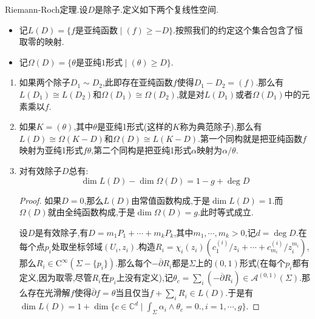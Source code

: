 Riemann-Roch定理.设$D$是除子.定义如下两个复线性空间.
\begin{itemize}
	\item 记$L(D)=\{f\text{是亚纯函数}\mid (f)\ge -D\}$.按照我们的约定这个集合包含了恒取零的映射.
	\item 记$\Omega(D)=\{\theta\text{是亚纯1形式}\mid (\theta)\ge D\}$.
\end{itemize}
\begin{enumerate}
	\item 如果两个除子$D_1\sim D_2$,此即存在亚纯函数$f$使得$D_1-D_2=(f)$.那么有$L(D_1)\cong L(D_2)$和$\Omega(D_1)\cong\Omega(D_2)$,就是对$L(D_1)$或者$\Omega(D_1)$中的元素乘以$f$.
	\item 如果$K=(\theta)$,其中$\theta$是亚纯1形式(这样的$K$称为典范除子),那么有$L(D)\cong\Omega(K-D)$和$\Omega(D)\cong L(K-D)$.第一个同构就是把亚纯函数$f$映射为亚纯1形式$f\theta$,第二个同构是把亚纯1形式$\alpha$映射为$\alpha/\theta$.
	\item 对有效除子$D$总有:
	$$\dim L(D)-\dim\Omega(D)=1-g+\deg D$$
	\begin{proof}
		
		如果$D=0$,那么$L(D)$由常值函数构成,于是$\dim L(D)=1$.而$\Omega(D)$就由全纯函数构成,于是$\dim\Omega(D)=g$.此时等式成立.
		
		\qquad
		
		设$D$是有效除子,有$D=m_1P_1+\cdots+m_kP_k$,其中$m_1,\cdots,m_k>0$,记$d=\deg D$.在每个点$p_i$处取坐标邻域$(U_i,z_i)$.构造$R_i=\chi_i(z_i)\left(c_1^{(i)}/z_i+\cdots+c_{m_i}^{(i)}/z_i^{m_i}\right)$,那么$R_i\in\mathrm{C}^{\infty}(\Sigma-\{p_i\})$.那么每个$-\overline{\partial}R_i$都是$\Sigma$上的$(0,1)$形式(在每个$p_i$都有定义,因为取零,尽管$R_i$在$p_i$上没有定义),记$\theta_c=\sum_i(-\overline{\partial}R_i)\in\mathscr{A}^{(0,1)}(\Sigma)$.那么存在光滑解$f$使得$\overline{\partial}f=\theta$当且仅当$f+\sum_iR_i\in L(D)$.于是有$\dim L(D)=1+\dim\{c\in\mathbb{C}^d\mid\int_{\Sigma}\alpha_i\wedge\theta_c=0.,i=1,\cdots,g\}$.
		
		\qquad
		

\end{proof}
\end{enumerate}
